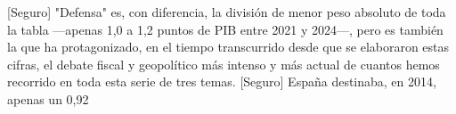 \documentclass[10pt,a4paper]{article}
\begin{document}
[Seguro] "Defensa" es, con diferencia, la división de menor peso absoluto de toda la tabla —apenas 1,0 a 1,2 puntos de PIB entre 2021 y 2024—, pero es también la que ha protagonizado, en el tiempo transcurrido desde que se elaboraron estas cifras, el debate fiscal y geopolítico más intenso y más actual de cuantos hemos recorrido en toda esta serie de tres temas. [Seguro] España destinaba, en 2014, apenas un 0,92%
\end{document}

